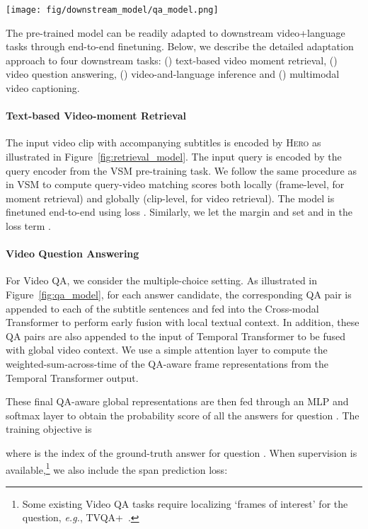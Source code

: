 \documentclass[11pt,a4paper]{article}
\begin{document}
\begin{figure*}[!t]
\centering
  \texttt{[image: fig/downstream\_model/qa\_model.png]}
 \caption{\textsc{Hero} model adapted to downstream task: Video Question Answering.} 
  \label{fig:qa_model}
\end{figure*} 

The pre-trained model can be readily adapted to downstream video+language tasks through end-to-end finetuning. Below, we describe the detailed adaptation approach to four downstream tasks: () text-based video moment retrieval, () video question answering, () video-and-language inference and () multimodal video captioning. 

\paragraph{Text-based Video-moment Retrieval} The input video clip with accompanying subtitles is encoded by \textsc{Hero} as illustrated in Figure~\ref{fig:retrieval_model}. 
The input query is encoded by the query encoder from the VSM pre-training task.
We follow the same procedure as in VSM to compute query-video matching scores both locally (frame-level, for moment retrieval) and globally (clip-level, for video retrieval). The model is finetuned end-to-end using loss . Similarly, we let the margin  and set  and  in the loss term .



\paragraph{Video Question Answering} For Video QA, we consider the multiple-choice setting. As illustrated in Figure~\ref{fig:qa_model}, for each answer candidate, the corresponding QA pair is appended to each of the subtitle sentences and fed into the Cross-modal Transformer to perform early fusion with local textual context. In addition, these QA pairs are also appended to the input of Temporal Transformer to be fused with global video context.
We use a simple attention layer to compute the weighted-sum-across-time of the QA-aware frame representations from the Temporal Transformer output.

These final QA-aware global representations are then fed through an MLP and softmax layer to obtain the probability score  of all the answers for question . The training objective is

where  is the index of the ground-truth answer for question .
When supervision is available,\footnote{Some existing Video QA tasks require localizing `frames of interest' for the question, \emph{e.g.}, TVQA+~\citep{lei2019tvqaplus}.} we also include the span prediction loss:
\end{document}
